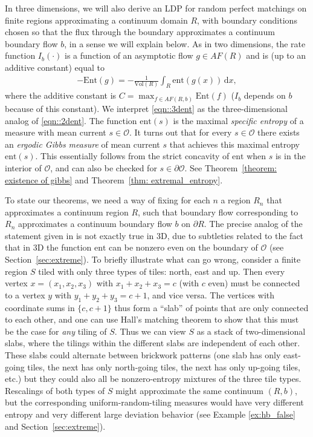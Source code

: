 \documentclass[11pt]{article}
\theoremstyle{remark}
\theoremstyle{definition}
\newcommand{\ent}{\text{ent}}
\newcommand{\Ent}{\text{Ent}}
\newcommand{\mc}[1]{\mathcal{#1}}
\newcommand{\dd}{\mathrm{d}}
\begin{document}
In three dimensions, we will also derive an LDP for random perfect matchings on finite regions approximating a continuum domain $R$, with boundary conditions chosen so that the flux through the boundary approximates a continuum boundary flow $b$, in a sense we will explain below. As in two dimensions, the rate function $I_b(\cdot)$ is a function of an asymptotic flow $g\in AF(R)$ and is (up to an additive constant) equal to 
\begin{align} \label{eqn::3dent}
    -\Ent(g) = -\frac{1}{\text{Vol}(R)} \int_{R} \ent(g(x))\, \dd x,
\end{align}
where the additive constant is $C = \max_{f\in AF(R,b)} \Ent(f)$ ($I_b$ depends on $b$ because of this constant). We interpret \eqref{eqn::3dent} as the three-dimensional analog of \eqref{eqn::2dent}. The function $\ent(s)$ is the maximal \textit{specific entropy} of a measure with mean current $s\in \mc O$. It turns out that for every $s \in \mc O$ there exists an \textit{ergodic Gibbs measure} of mean current $s$ that achieves this maximal entropy $\ent(s)$. This essentially follows from the strict concavity of $\ent$ when $s$ is in the interior of $\mc O$, and can also be checked for $s \in \partial \mc O$. See Theorem~\ref{theorem: existence of gibbs} and Theorem~\ref{thm: extremal_entropy}. 

To state our theorems, we need a way of fixing for each $n$ a region $R_n$ that approximates a continuum region $R$, such that boundary flow corresponding to $R_n$ approximates a continuum boundary flow $b$ on $\partial R$. The precise analog of the statement given in \cite{cohn2001variational} is not exactly true in 3D, due to subtleties related to the fact that in 3D the function $\ent$ can be nonzero even on the boundary of $\mc O$ (see  Section~\ref{sec:extreme}). To briefly illustrate what can go wrong, consider a finite region $S$ tiled with only three types of tiles: north, east and up. Then every vertex $x = (x_1,x_2,x_3)$ with $x_1+x_2+x_3 = c$ (with $c$ even) must be connected to a vertex $y$ with $y_1+y_2+y_3 = c+1$, and vice versa. The vertices with coordinate sums in $\{c, c+1 \}$ thus form a ``slab'' of points that are only connected to each other, and one can use Hall's matching theorem to show that this must be the case for {\em any} tiling of $S$. Thus we can view $S$ as a stack of two-dimensional slabs, where the tilings within the different slabs are independent of each other.  These slabs could alternate between brickwork patterns (one slab has only east-going tiles, the next has only north-going tiles, the next has only up-going tiles, etc.) but they could also all be nonzero-entropy mixtures of the three tile types. Rescalings of both types of $S$ might approximate the same continuum $(R,b)$, but the corresponding uniform-random-tiling measures would have very different entropy and very different large deviation behavior (see Example \ref{ex:hb_false} and Section~\ref{sec:extreme}).
\end{document}
